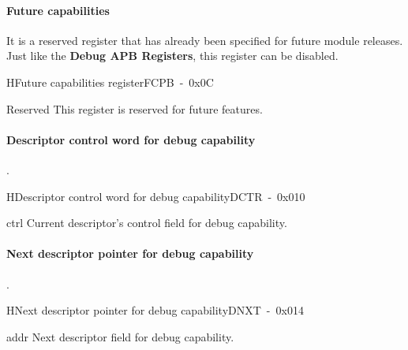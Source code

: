 \newpage
\paragraph{Future capabilities} It is a reserved register that has already been specified for future module releases. Just like the \textbf{Debug APB Registers}, this register can be disabled.\\

\begin{register}{H}{Future capabilities register}{FCPB~-~0x0C}
    \label{reg_fcpb}%
    \regnewline%
    \begin{regdesc}\begin{reglist}
        \item [Reserved] This register is reserved for future features.
\end{reglist}\end{regdesc}\end{register}


\paragraph{Descriptor control word for debug capability}.\\

\begin{register}{H}{Descriptor control word for debug capability}{DCTR~-~0x010}
    \label{reg_dctr}%
    \regnewline%
    \begin{regdesc}\begin{reglist}
        \item [ctrl]Current descriptor's control field for debug capability.
\end{reglist}\end{regdesc}\end{register}


\paragraph{Next descriptor pointer for debug capability}.\\

\begin{register}{H}{Next descriptor pointer for debug capability}{DNXT~-~0x014}
    \label{reg_dnxt}%
    \regnewline%
    \begin{regdesc}\begin{reglist}
        \item [addr]Next descriptor field for debug capability.
\end{reglist}\end{regdesc}\end{register}


